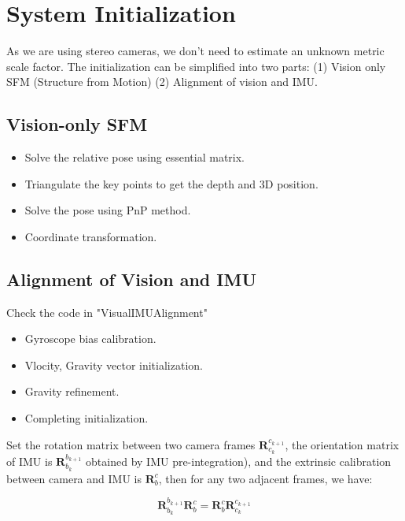\documentclass[12pt]{report}   %
\begin{document}
\chapter{System Initialization}


As we are using stereo cameras, we don't need to estimate an unknown metric scale factor. The initialization can be simplified into two parts: (1) Vision only SFM (Structure from Motion) (2) Alignment of vision and IMU.

\section{Vision-only SFM}

\begin{itemize}
	\item Solve the relative pose using essential matrix.
	\item Triangulate the key points to get the depth and 3D position.
	\item Solve the pose using PnP method.
	\item Coordinate transformation.
	
\end{itemize}


\section{Alignment of Vision and IMU}

Check the code in "VisualIMUAlignment"

\begin{itemize}
	\item Gyroscope bias calibration.
	\item Vlocity, Gravity vector initialization.
	\item Gravity refinement.
	\item Completing initialization.
	
\end{itemize}

Set the rotation matrix between two camera frames $\bm{R}_{c_k}^{c_{k+1}}$, the orientation matrix of IMU is $\bm{R}_{b_k}^{b_{k+1}}$ obtained by IMU pre-integration), and the extrinsic calibration between camera and IMU is $\bm{R}_b^c$, then for any two adjacent frames, we have:

\begin{equation}
	\bm{R}_{b_k}^{b_{k+1}}\bm{R}_b^c = \bm{R}_b^c\bm{R}_{c_k}^{c_{k+1}}
\end{equation}
\end{document}
